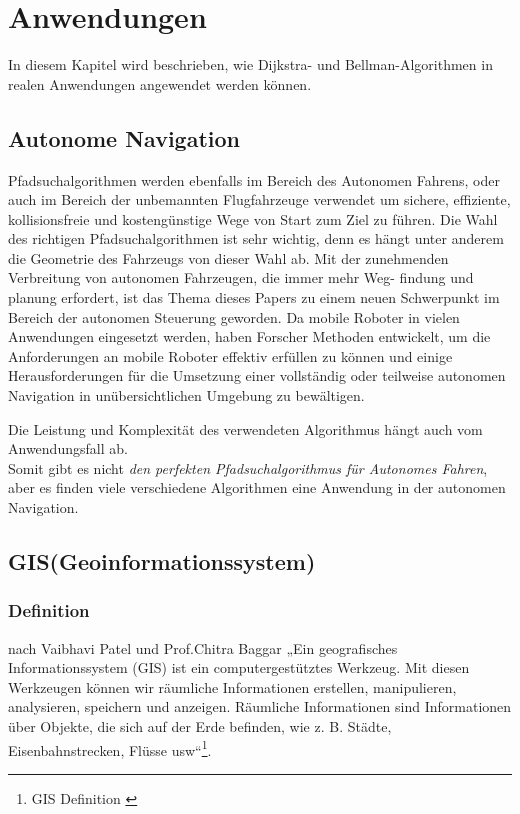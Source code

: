 \chapter{Anwendungen}
\label{Anwendungen}

In diesem Kapitel wird beschrieben, wie Dijkstra- und Bellman-Algorithmen in realen Anwendungen angewendet werden können.

\section{Autonome Navigation}
\label{Autonome Navigation}

Pfadsuchalgorithmen werden ebenfalls im Bereich des Autonomen Fahrens, oder auch im Bereich der unbemannten Flugfahrzeuge verwendet
um sichere, effiziente, kollisionsfreie und kostengünstige Wege von Start zum Ziel zu führen. Die Wahl des richtigen Pfadsuchalgorithmen
ist sehr wichtig, denn es hängt unter anderem die Geometrie des Fahrzeugs von dieser Wahl ab.
Mit der zunehmenden Verbreitung von autonomen Fahrzeugen, die immer mehr Weg- findung und planung erfordert, ist das Thema dieses Papers 
zu einem neuen Schwerpunkt im Bereich der autonomen Steuerung geworden.
Da mobile Roboter in vielen Anwendungen eingesetzt werden, haben Forscher Methoden entwickelt, um die 
Anforderungen an mobile Roboter effektiv erfüllen zu können und einige Herausforderungen für die Umsetzung einer vollständig oder
teilweise autonomen Navigation in unübersichtlichen Umgebung zu bewältigen.\cite{Karur:21}

Die Leistung und Komplexität des verwendeten Algorithmus hängt auch vom Anwendungsfall ab. \cite{Karur:21}\\
Somit gibt es nicht \emph{den perfekten Pfadsuchalgorithmus für Autonomes Fahren}, aber es finden viele verschiedene Algorithmen eine 
Anwendung in der autonomen Navigation.


\section{GIS(Geoinformationssystem)}

\subsection{Definition}


nach Vaibhavi Patel und Prof.Chitra Baggar „Ein geografisches Informationssystem (GIS) ist ein computergestütztes Werkzeug. Mit diesen Werkzeugen können wir räumliche Informationen erstellen, manipulieren, analysieren, speichern und anzeigen. Räumliche Informationen sind Informationen über Objekte, die sich auf der Erde befinden, wie z. B. Städte, Eisenbahnstrecken, Flüsse usw“\footnote{GIS Definition \cite{Research-id10}}. 

